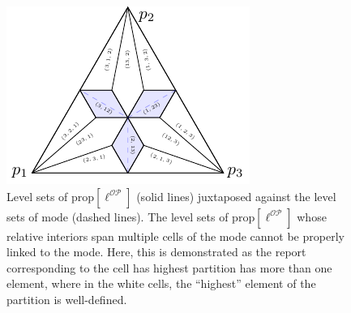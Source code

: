 \documentclass[11pt]{article}
\newcommand{\prop}[1]{\mathrm{prop}[#1]}
\newcommand{\mode}{\mathrm{mode}}
\newcommand{\OP}{\mathcal{OP}}
\begin{document}
\begin{figure}[H]
	\begin{minipage}{0.47\linewidth}
		\centering
		\includegraphics[width=0.9\linewidth]{tikz/ordered-partition}
	\end{minipage}
	\hfill
	\begin{minipage}{0.5\linewidth}
		\caption{Level sets of $\prop{\ell^\OP}$ (solid lines)
			juxtaposed against the level sets of $\mode$ (dashed lines).
		The level sets of $\prop{\ell^\OP}$ whose relative interiors span multiple cells of the mode cannot be properly linked to the mode.
		Here, this is demonstrated as the report corresponding to the cell has highest partition has more than one element, where in the white cells, the ``highest'' element of the partition is well-defined.}
		\label{fig:ordered-partition}
	\end{minipage}
\end{figure}
\end{document}
